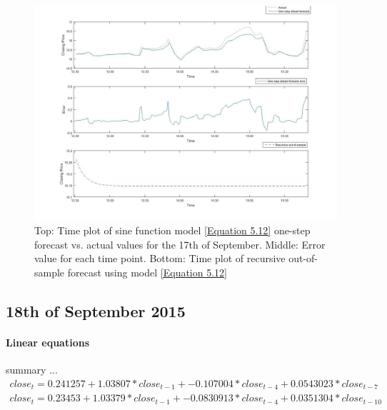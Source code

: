 \documentclass[13pt]{report}
\begin{document}
\begin{figure}[H]
\centering
\label{VWNonlinear17fig}
\includegraphics[width=\textwidth]{17nonlinear}
\caption{Top: Time plot of sine function model \ref{Equation 5.12} one-step forecast vs. actual values for the 17th of September. Middle: Error value for each time point. Bottom: Time plot of recursive out-of-sample forecast using model \ref{Equation 5.12}}
\end{figure}


\subsection{18th of September 2015}
\paragraph{Linear equations}\hfill \break
summary ...
\begin{equation}
\begin{align*}
close_{t} = 0.241257 + 1.03807 * close_{t-1} + -0.107004 * close_{t-4} + 0.0543023 * close_{t-7} 
\end{align*}
\label{Equation 5.13}
\end{equation}
\begin{equation}
\begin{align*}
 close_{t} = 0.23453 + 1.03379 * close_{t-1} + -0.0830913 * close_{t-4} + 0.0351304 * close_{t-10} 
\end{align*}
\label{Equation 5.14}
\end{equation}
\end{document}
